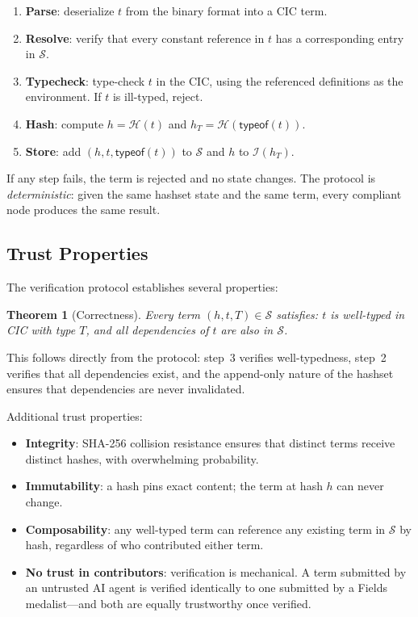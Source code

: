 \documentclass[11pt]{article}
\theoremstyle{definition}
\theoremstyle{plain}
\newtheorem{theorem}{Theorem}[section]
\theoremstyle{remark}
\newcommand{\hash}{\mathcal{H}}
\newcommand{\hashset}{\mathcal{S}}
\newcommand{\typeindex}{\mathcal{I}}
\begin{document}
\begin{enumerate}[nosep]
  \item \textbf{Parse}: deserialize $t$ from the binary format into a CIC term.
  \item \textbf{Resolve}: verify that every constant reference in $t$ has a corresponding entry in $\hashset$.
  \item \textbf{Typecheck}: type-check $t$ in the CIC, using the referenced definitions as the environment.
    If $t$ is ill-typed, reject.
  \item \textbf{Hash}: compute $h = \hash(t)$ and $h_T = \hash(\textsf{typeof}(t))$.
  \item \textbf{Store}: add $(h, t, \textsf{typeof}(t))$ to $\hashset$ and $h$ to $\typeindex(h_T)$.
\end{enumerate}

If any step fails, the term is rejected and no state changes.
The protocol is \emph{deterministic}: given the same hashset state and the same term, every
compliant node produces the same result.

\subsection{Trust Properties}
\label{sec:trust-properties}

The verification protocol establishes several properties:

\begin{theorem}[Correctness]
\label{thm:correctness}
Every term $(h, t, T) \in \hashset$ satisfies: $t$ is well-typed in CIC with type $T$,
and all dependencies of $t$ are also in $\hashset$.
\end{theorem}

This follows directly from the protocol: step~3 verifies well-typedness, step~2 verifies
that all dependencies exist, and the append-only nature of the hashset ensures that
dependencies are never invalidated.

Additional trust properties:
\begin{itemize}[nosep]
  \item \textbf{Integrity}: SHA-256 collision resistance ensures that distinct terms receive
    distinct hashes, with overwhelming probability.
  \item \textbf{Immutability}: a hash pins exact content; the term at hash $h$ can never change.
  \item \textbf{Composability}: any well-typed term can reference any existing term in $\hashset$ by hash,
    regardless of who contributed either term.
  \item \textbf{No trust in contributors}: verification is mechanical.
    A term submitted by an untrusted AI agent is verified identically to one submitted by a
    Fields medalist---and both are equally trustworthy once verified.
\end{itemize}
\end{document}

